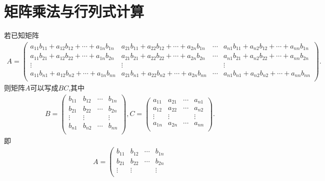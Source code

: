 \documentclass[../../main.tex]{subfiles}%
\begin{document}
\section{矩阵乘法与行列式计算}

\begin{proposition}\label{proposition:可以写成两个矩阵(向量)乘积的矩阵}
若已知矩阵\begin{align*}
A=\left( \begin{matrix}
a_{11}b_{11}+a_{12}b_{12}+\cdots +a_{1n}b_{1n}&		a_{21}b_{11}+a_{22}b_{12}+\cdots +a_{2n}b_{1n}&		\cdots&		a_{n1}b_{11}+a_{n2}b_{12}+\cdots +a_{nn}b_{1n}\\
a_{11}b_{21}+a_{12}b_{22}+\cdots +a_{1n}b_{2n}&		a_{21}b_{21}+a_{22}b_{22}+\cdots +a_{2n}b_{2n}&		\cdots&		a_{n1}b_{21}+a_{n2}b_{22}+\cdots +a_{nn}b_{2n}\\
\vdots&		\vdots&		&		\vdots\\
a_{11}b_{n1}+a_{12}b_{n2}+\cdots +a_{1n}b_{nn}&		a_{21}b_{n1}+a_{22}b_{n2}+\cdots +a_{2n}b_{nn}&		\cdots&		a_{n1}b_{n1}+a_{n2}b_{n2}+\cdots +a_{nn}b_{nn}\\
\end{matrix} \right) .
\end{align*}
则矩阵$A$可以写成$BC$,其中
\begin{align*}
B=\left( \begin{matrix}
b_{11}&		b_{12}&		\cdots&		b_{1n}\\
b_{21}&		b_{22}&		\cdots&		b_{2n}\\
\vdots&		\vdots&		&		\vdots\\
b_{n1}&		b_{n2}&		\cdots&		b_{nn}\\
\end{matrix} \right),
C=\left( \begin{matrix}
a_{11}&		a_{21}&		\cdots&		a_{n1}\\
a_{12}&		a_{22}&		\cdots&		a_{n2}\\
\vdots&		\vdots&		&		\vdots\\
a_{1n}&		a_{2n}&		\cdots&		a_{nn}\\
\end{matrix} \right) .
\end{align*}
即\begin{align*}
A=\left( \begin{matrix}
b_{11}&		b_{12}&		\cdots&		b_{1n}\\
b_{21}&		b_{22}&		\cdots&		b_{2n}\\
\vdots&		\vdots&		&		\vdots\\

\end{matrix}
\end{align*}
\end{proposition}
\end{document}
